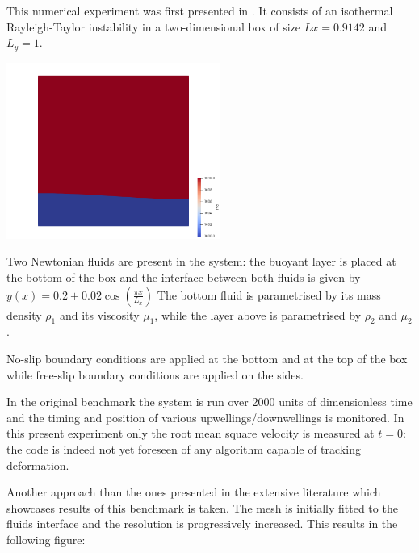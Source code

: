 This numerical experiment was first presented in \cite{vkks97}.
It consists of an isothermal Rayleigh-Taylor instability in a two-dimensional box
of size $Lx=0.9142$ and $L_y=1$.

\begin{center}
\includegraphics[width=7cm]{python_codes/fieldstone_25/images/setup}
\end{center}

Two Newtonian fluids are present in the system: the buoyant layer is placed at the bottom of 
the box and the interface between both fluids is given by 
$
y(x)=0.2+0.02\cos \left( \frac{\pi x}{L_x}  \right)
$
The bottom fluid is parametrised by its mass density $\rho_1$ and its viscosity $\mu_1$, 
while the layer above is parametrised by $\rho_2$ and $\mu_2$.

No-slip boundary conditions are applied at the bottom and at the top of the box 
while free-slip boundary conditions are applied on the sides. 

In the original benchmark the system is run over 2000 units of dimensionless time and the 
timing and position of various upwellings/downwellings is monitored. 
In this present experiment only the root mean square velocity is measured at $t=0$:
the code is indeed not yet foreseen of any algorithm capable of tracking deformation.

Another approach than the ones presented in the extensive literature which showcases 
results of this benchmark is taken. The mesh is initially fitted to the fluids
interface and the resolution is progressively increased. This results in the 
following figure:


